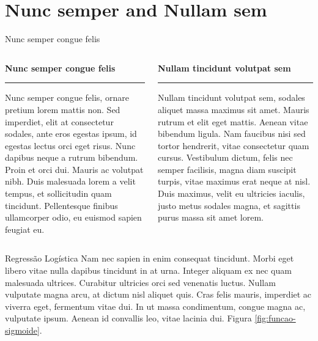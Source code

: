 \documentclass[10pt,fleqn]{beamer}
\begin{document}
\section{Nunc semper and Nullam sem}
\label{sec:nunc-semper-congue-felis}
\begin{frame}{Nunc semper congue felis}
    \begin{columns}[T] %
        \begin{column}{.48\textwidth}
            \textbf{Nunc semper congue felis}
            \color{couleurbarretitreslide}\rule{\linewidth}{2pt} \color{black}
            \newline
            Nunc semper congue felis, ornare pretium lorem mattis non. Sed imperdiet, elit at consectetur sodales, ante eros egestas ipsum, id egestas lectus orci eget risus. Nunc dapibus neque a rutrum bibendum. Proin et orci dui. Mauris ac volutpat nibh. Duis malesuada lorem a velit tempus, et sollicitudin quam tincidunt. Pellentesque finibus ullamcorper odio, eu euismod sapien feugiat eu.
        \end{column}%
        
        \hfill%
        
        \begin{column}{.48\textwidth}
            \textbf{Nullam tincidunt volutpat sem}
            \color{couleurbarretitreslide}\rule{\linewidth}{2pt} \color{black}
            \newline
            Nullam tincidunt volutpat sem, sodales aliquet massa maximus sit amet. Mauris rutrum et elit eget mattis. Aenean vitae bibendum ligula. Nam faucibus nisi sed tortor hendrerit, vitae consectetur quam cursus. Vestibulum dictum, felis nec semper facilisis, magna diam suscipit turpis, vitae maximus erat neque at nisl. Duis maximus, velit eu ultricies iaculis, justo metus sodales magna, et sagittis purus massa sit amet lorem.
        \end{column}%
        
    \end{columns}
\end{frame}

\begin{frame}{Regressão Logística}
    Nam nec sapien in enim consequat tincidunt. Morbi eget libero vitae nulla dapibus tincidunt in at urna. Integer aliquam ex nec quam malesuada ultrices. Curabitur ultricies orci sed venenatis luctus. Nullam vulputate magna arcu, at dictum nisl aliquet quis. Cras felis mauris, imperdiet ac viverra eget, fermentum vitae dui. In ut massa condimentum, congue magna ac, vulputate ipsum. Aenean id convallis leo, vitae lacinia dui. Figura \ref{fig:funcao-sigmoide}.    
\end{frame}
\end{document}
